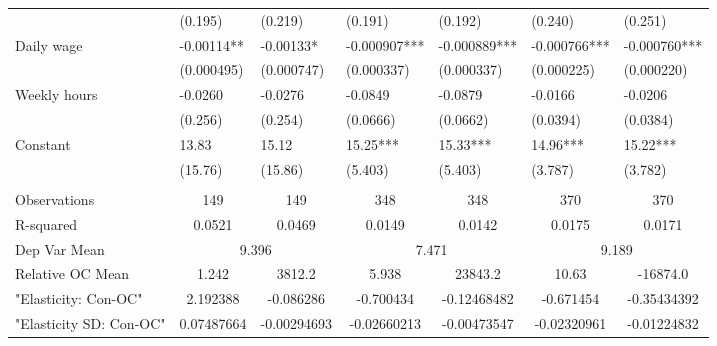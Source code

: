 \begin{tabular}{lcccccc}
      & \multicolumn{1}{l}{(0.195)} & \multicolumn{1}{l}{(0.219)} & \multicolumn{1}{l}{(0.191)} & \multicolumn{1}{l}{(0.192)} & \multicolumn{1}{l}{(0.240)} & \multicolumn{1}{l}{(0.251)} \\
Daily wage & \multicolumn{1}{l}{-0.00114**} & \multicolumn{1}{l}{-0.00133*} & \multicolumn{1}{l}{-0.000907***} & \multicolumn{1}{l}{-0.000889***} & \multicolumn{1}{l}{-0.000766***} & \multicolumn{1}{l}{-0.000760***} \\
      & \multicolumn{1}{l}{(0.000495)} & \multicolumn{1}{l}{(0.000747)} & \multicolumn{1}{l}{(0.000337)} & \multicolumn{1}{l}{(0.000337)} & \multicolumn{1}{l}{(0.000225)} & \multicolumn{1}{l}{(0.000220)} \\
Weekly hours & \multicolumn{1}{l}{-0.0260} & \multicolumn{1}{l}{-0.0276} & \multicolumn{1}{l}{-0.0849} & \multicolumn{1}{l}{-0.0879} & \multicolumn{1}{l}{-0.0166} & \multicolumn{1}{l}{-0.0206} \\
      & \multicolumn{1}{l}{(0.256)} & \multicolumn{1}{l}{(0.254)} & \multicolumn{1}{l}{(0.0666)} & \multicolumn{1}{l}{(0.0662)} & \multicolumn{1}{l}{(0.0394)} & \multicolumn{1}{l}{(0.0384)} \\
Constant & \multicolumn{1}{l}{13.83} & \multicolumn{1}{l}{15.12} & \multicolumn{1}{l}{15.25***} & \multicolumn{1}{l}{15.33***} & \multicolumn{1}{l}{14.96***} & \multicolumn{1}{l}{15.22***} \\
      & \multicolumn{1}{l}{(15.76)} & \multicolumn{1}{l}{(15.86)} & \multicolumn{1}{l}{(5.403)} & \multicolumn{1}{l}{(5.403)} & \multicolumn{1}{l}{(3.787)} & \multicolumn{1}{l}{(3.782)} \\
      &       &       &       &       &       &  \\
\midrule
Observations & 149   & 149   & 348   & 348   & 370   & 370 \\
R-squared & 0.0521 & 0.0469 & 0.0149 & 0.0142 & 0.0175 & 0.0171 \\
Dep Var Mean & \multicolumn{2}{c}{9.396} & \multicolumn{2}{c}{7.471} & \multicolumn{2}{c}{9.189} \\
Relative OC Mean & 1.242 & 3812.2 & 5.938 & 23843.2 & 10.63 & -16874.0 \\
"Elasticity: Con-OC" & 2.192388 & -0.086286 & -0.700434 & -0.12468482 & -0.671454 & -0.35434392 \\
"Elasticity SD: Con-OC" & 0.07487664 & -0.00294693 & -0.02660213 & -0.00473547 & -0.02320961 & -0.01224832 \\
\bottomrule
\end{tabular}%
